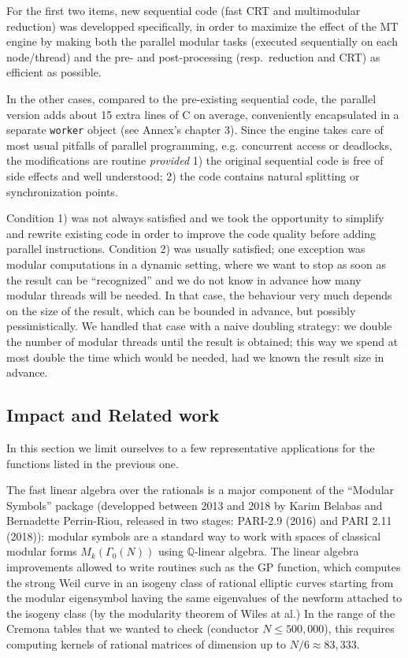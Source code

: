 \documentclass{deliverablereport}
\begin{document}
For the first two items, new sequential code (fast CRT and multimodular
reduction) was developped specifically, in order to maximize the effect of
the MT engine by making both the parallel modular tasks (executed
sequentially on each node/thread) and the pre- and post-processing
(resp.~reduction and CRT) as efficient as possible.

In the other cases, compared to the pre-existing sequential code, the
parallel version adds about 15 extra lines of C on average, conveniently
encapsulated in a separate \texttt{worker} object (see Annex's chapter 3).
Since the engine takes care of most usual pitfalls of parallel programming,
e.g. concurrent access or deadlocks, the modifications are routine
\emph{provided} 1) the original sequential code is free of side effects and
well understood; 2) the code contains natural splitting or synchronization
points.

Condition 1) was not always satisfied and we took the opportunity to simplify
and rewrite existing code in order to improve the code quality before adding
parallel instructions. Condition 2) was usually satisfied; one exception was
modular computations in a dynamic setting, where we want to stop as soon as
the result can be ``recognized'' and we do not know in advance how many
modular threads will be needed. In that case, the behaviour very much depends
on the size of the result, which can be bounded in advance, but possibly
pessimistically. We handled that case with a naive doubling strategy: we
double the number of modular threads until the result is obtained; this way
we spend at most double the time which would be needed, had we known the
result size in advance.

\subsection{Impact and Related work}

In this section we limit ourselves to a few representative applications
for the functions listed in the previous one.

The fast linear algebra over the rationals is a major component
of the ``Modular Symbols'' package (developped between 2013 and 2018
by Karim Belabas and Bernadette Perrin-Riou, released in two stages: PARI-2.9
(2016) and PARI 2.11 (2018)): modular symbols are a standard way to work with
spaces of classical modular forms $M_k(\Gamma_0(N))$ using
$\mathbb{Q}$-linear algebra. The linear algebra improvements allowed to write
routines such as the  GP function, which computes the
strong Weil curve in an isogeny class of rational elliptic curves starting
from the modular eigensymbol having the same eigenvalues of the newform
attached to the isogeny class (by the modularity theorem of Wiles at al.) In
the range of the Cremona tables that we wanted to check (conductor $N \leq
500,000$), this requires computing kernels of rational matrices of dimension
up to $N / 6\approx 83,333$.
\end{document}

